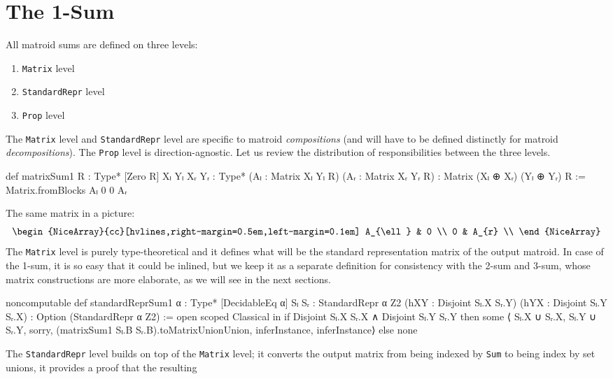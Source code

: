 \section{The 1-Sum}

All matroid sums are defined on three levels:
\begin{enumerate}
    \item \texttt{Matrix} level
    \item \texttt{StandardRepr} level
    \item \texttt{Prop} level
\end{enumerate}
The \texttt{Matrix} level and \texttt{StandardRepr} level are specific to matroid \emph{compositions}
(and will have to be defined distinctly for matroid \emph{decompositions}).
The \texttt{Prop} level is direction-agnostic.
Let us review the distribution of responsibilities between the three levels.
\begin{leancode}
def matrixSum1 {R : Type*} [Zero R]
    {Xₗ Yₗ Xᵣ Yᵣ : Type*}
    (Aₗ : Matrix Xₗ Yₗ R) (Aᵣ : Matrix Xᵣ Yᵣ R) :
    Matrix (Xₗ ⊕ Xᵣ) (Yₗ ⊕ Yᵣ) R :=
  Matrix.fromBlocks Aₗ 0 0 Aᵣ
\end{leancode}
The same matrix in a picture:
\[
    \begin{NiceArray}{cc}[hvlines,right-margin=0.5em,left-margin=0.1em]
        A_{\ell} & 0 \\
        0 & A_{r} \\
    \end{NiceArray}
\]
The \texttt{Matrix} level is purely type-theoretical and it defines what will be the
standard representation matrix of the output matroid. In case of the 1-sum,
it is so easy that it could be inlined, but we keep it as a separate definition
for consistency with the 2-sum and 3-sum, whose matrix constructions are
more elaborate, as we will see in the next sections.
\begin{leancode}
noncomputable def standardReprSum1
    {α : Type*} [DecidableEq α]
    {Sₗ Sᵣ : StandardRepr α Z2}
    (hXY : Disjoint Sₗ.X Sᵣ.Y)
    (hYX : Disjoint Sₗ.Y Sᵣ.X) :
    Option (StandardRepr α Z2) :=
  open scoped Classical in if
    Disjoint Sₗ.X Sᵣ.X ∧ Disjoint Sₗ.Y Sᵣ.Y
  then
    some ⟨
      Sₗ.X ∪ Sᵣ.X,
      Sₗ.Y ∪ Sᵣ.Y,
      sorry,
      (matrixSum1 Sₗ.B Sᵣ.B).toMatrixUnionUnion,
      inferInstance,
      inferInstance⟩
  else
    none
\end{leancode}
The \texttt{StandardRepr} level builds on top of the \texttt{Matrix} level;
it converts the output matrix from being indexed by \texttt{Sum} to
being index by set unions, it provides a proof that the resulting
